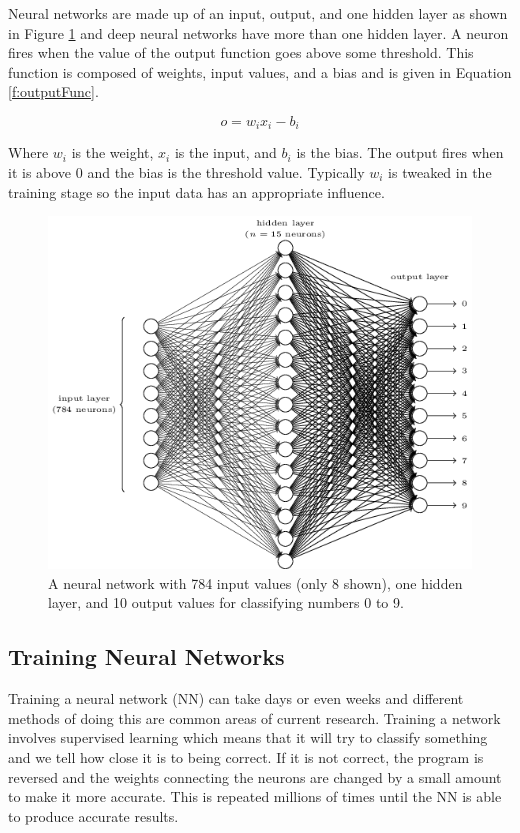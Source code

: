 \documentclass{bhamthesis}
\theoremstyle{definition}
\begin{document}
Neural networks are made up of an input, output, and one hidden layer as shown in Figure \ref{f:NN} and deep neural networks have more than one hidden layer. A neuron fires when the value of the output function goes above some threshold. This function is composed of weights, input values, and a bias and is given in Equation \ref{f:outputFunc}.

\begin{equation}\label{f:outputFunc}
o = w_ix_i - b_i
\end{equation}

Where $w_i$ is the weight, $x_i$ is the input, and $b_i$ is the bias. The output fires when it is above $0$ and the bias is the threshold value. Typically $w_i$ is tweaked in the training stage so the input data has an appropriate influence.


\begin{figure}
	\includegraphics[width=\textwidth]{media/img/nnArch2}
	\caption{A neural network with 784 input values (only 8 shown), one hidden layer, and 10 output values for classifying numbers 0 to 9. \cite{Neilsen2015}}\label{f:NN}
\end{figure}


\subsection{Training Neural Networks}\label{s:nnTrainLit}
Training a neural network (NN) can take days or even weeks and different methods of doing this are common areas of current research. Training a network involves supervised learning which means that it will try to classify something and we tell how close it is to being correct. If it is not correct, the program is reversed and the weights connecting the neurons are changed by a small amount to make it more accurate. This is repeated millions of times until the NN is able to produce accurate results.
\end{document}
